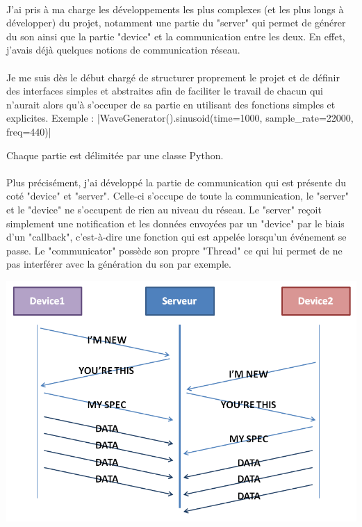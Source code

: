 \documentclass[12pt]{article}
\begin{document}
	\paragraph{}
	J’ai pris à ma charge les développements les plus complexes (et les plus longs à développer) du projet, notamment une partie du "server" qui permet de générer du son ainsi que la partie "device" et la communication entre les deux. En effet, j'avais déjà quelques notions de communication réseau.
	
	\paragraph{}
	Je me suis dès le début chargé de structurer proprement le projet et de définir des interfaces simples et abstraites afin de faciliter le travail de chacun qui n'aurait alors qu'à s'occuper de sa partie en utilisant des fonctions simples et explicites. Exemple :
	|WaveGenerator().sinusoid(time=1000, sample_rate=22000, freq=440)|
	
	Chaque partie est délimitée par une classe Python.
	
	\paragraph{}
	Plus précisément, j'ai développé la partie de communication qui est présente du coté "device" et "server". Celle-ci s'occupe de toute la communication, le "server" et le "device" ne s'occupent de rien au niveau du réseau. Le "server" reçoit simplement une notification et les données envoyées par un "device" par le biais d'un "callback", c'est-à-dire une fonction qui est appelée lorsqu'un événement se passe. Le "communicator" possède son propre "Thread" ce qui lui permet de ne pas interférer avec la génération du son par exemple.
	
	\vspace{1cm}
	\noindent
	\includegraphics[width=\textwidth]{communication_example}
	\vspace{1cm}
	
\end{document}
